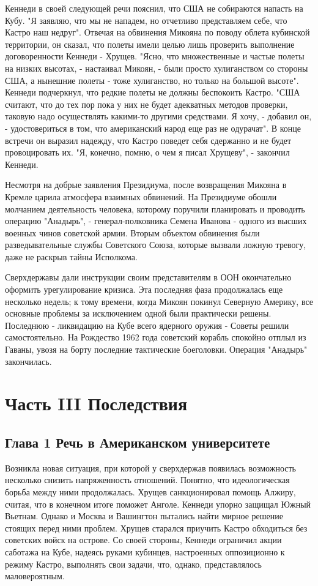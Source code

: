 \documentclass[14pt]{extreport}
\begin{document}
Кеннеди в своей следующей речи пояснил, что США не собираются напасть на Кубу. "Я заявляю, что мы не нападем, но отчетливо представляем себе, что Кастро наш недруг". Отвечая на обвинения Микояна по поводу облета кубинской территории, он сказал, что полеты имели целью лишь проверить выполнение договоренности Кеннеди - Хрущев. "Ясно, что множественные и частые полеты на низких высотах, - настаивал Микоян, - были просто хулиганством со стороны США, а нынешние полеты - тоже хулиганство, но только на большой высоте". Кеннеди подчеркнул, что редкие полеты не должны беспокоить Кастро. "США считают, что до тех пор пока у них не будет адекватных методов проверки, таковую надо осуществлять какими-то другими средствами. Я хочу, - добавил он, - удостовериться в том, что американский народ еще раз не одурачат". В конце встречи он выразил надежду, что Кастро поведет себя сдержанно и не будет провоцировать их. "Я, конечно, помню, о чем я писал Хрущеву", - закончил Кеннеди.

Несмотря на добрые заявления Президиума, после возвращения Микояна в Кремле царила атмосфера взаимных обвинений. На Президиуме обошли молчанием деятельность человека, которому поручили планировать и проводить операцию "Анадырь", - генерал-полковника Семена Иванова - одного из высших военных чинов советской армии. Вторым объектом обвинения были разведывательные службы Советского Союза, которые вызвали ложную тревогу, даже не раскрыв тайны Исполкома.

Сверхдержавы дали инструкции своим представителям в ООН окончательно оформить урегулирование кризиса. Эта последняя фаза продолжалась еще несколько недель; к тому времени, когда Микоян покинул Северную Америку, все основные проблемы за исключением одной были практически решены. Последнюю - ликвидацию на Кубе всего ядерного оружия - Советы решили самостоятельно. На Рождество 1962 года советский корабль спокойно отплыл из Гаваны, увозя на борту последние тактические боеголовки. Операция "Анадырь" закончилась.

\chapter{Часть III Последствия}

\section{Глава 1 Речь в Американском университете}

Возникла новая ситуация, при которой у сверхдержав появилась возможность несколько снизить напряженность отношений. Понятно, что идеологическая борьба между ними продолжалась. Хрущев санкционировал помощь Алжиру, считая, что в конечном итоге поможет Анголе. Кеннеди упорно защищал Южный Вьетнам. Однако и Москва и Вашингтон пытались найти мирное решение стоящих перед ними проблем. Хрущев старался приучить Кастро обходиться без советских войск на острове. Со своей стороны, Кеннеди ограничил акции саботажа на Кубе, надеясь руками кубинцев, настроенных оппозиционно к режиму Кастро, выполнять свои задачи, что, однако, представлялось маловероятным.
\end{document}
